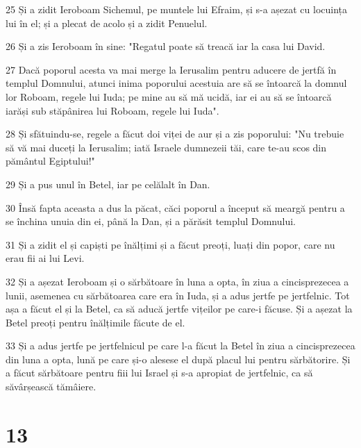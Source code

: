 \par 25 Și a zidit Ieroboam Sichemul, pe muntele lui Efraim, și s-a așezat cu locuința lui în el; și a plecat de acolo și a zidit Penuelul.
\par 26 Și a zis Ieroboam în sine: "Regatul poate să treacă iar la casa lui David.
\par 27 Dacă poporul acesta va mai merge la Ierusalim pentru aducere de jertfă în templul Domnului, atunci inima poporului acestuia are să se întoarcă la domnul lor Roboam, regele lui Iuda; pe mine au să mă ucidă, iar ei au să se întoarcă iarăși sub stăpânirea lui Roboam, regele lui Iuda".
\par 28 Și sfătuindu-se, regele a făcut doi viței de aur și a zis poporului: "Nu trebuie să vă mai duceți la Ierusalim; iată Israele dumnezeii tăi, care te-au scos din pământul Egiptului!"
\par 29 Și a pus unul în Betel, iar pe celălalt în Dan.
\par 30 Însă fapta aceasta a dus la păcat, căci poporul a început să meargă pentru a se închina unuia din ei, până la Dan, și a părăsit templul Domnului.
\par 31 Și a zidit el și capiști pe înălțimi și a făcut preoți, luați din popor, care nu erau fii ai lui Levi.
\par 32 Și a așezat Ieroboam și o sărbătoare în luna a opta, în ziua a cincisprezecea a lunii, asemenea cu sărbătoarea care era în Iuda, și a adus jertfe pe jertfelnic. Tot așa a făcut el și la Betel, ca să aducă jertfe vițeilor pe care-i făcuse. Și a așezat la Betel preoți pentru înălțimile făcute de el.
\par 33 Și a adus jertfe pe jertfelnicul pe care l-a făcut la Betel în ziua a cincisprezecea din luna a opta, lună pe care și-o alesese el după placul lui pentru sărbătorire. Și a făcut sărbătoare pentru fiii lui Israel și s-a apropiat de jertfelnic, ca să săvârșească tămâiere.

\chapter{13}

